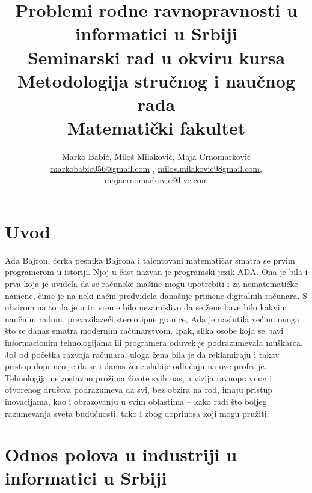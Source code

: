 \documentclass[a4paper]{article}
\begin{document}
\title{Problemi rodne ravnopravnosti u informatici u Srbiji\\
\vspace{5mm}
\small{Seminarski rad u okviru kursa\\Metodologija stručnog i naučnog rada\\ Matematički fakultet}}

\author{Marko Babić, Miloš Milaković,  Maja Crnomarković\\ \href{mailto:markobabic056@gmail.com}{markobabic056@gmail.com} , \href{mailto:milos.milakovic98@gmail.com}{milos.milakovic98gmail.com}, \href{mailto:majacrnomarkovic@live.com}{majacrnomarkovic@live.com}}

\maketitle


\tableofcontents

\newpage

\section{Uvod}
\label{sec:uvod}

Ada Bajron, ćerka pesnika Bajrona i talentovani matematičar smatra se prvim programerom u istoriji. Njoj u čast nazvan je programski jezik ADA. Ona je bila i prva koja je uvidela da se računske mašine mogu upotrebiti i za nematematičke namene,
čime je na neki način predvidela današnje primene digitalnih računara. S obzirom na to da je u to vreme bilo nezamislivo da se žene bave bilo kakvim naučnim radom, prevazilazeći stereotipne granice, Ada je naslutila većinu onoga što se danas smatra modernim računarstvom.
Ipak, slika osobe koja se bavi informacionim tehnologijama ili programera oduvek je podrazumevala muškarca. Još od početka razvoja računara, uloga žena bila je da reklamiraju    i takav pristup doprineo je da se i danas žene slabije odlučuju na ove profesije. Tehnologija neizostavno prožima živote svih nas, a vizija ravnopravnog i otvorenog društva podrazumeva da svi, bez obzira na rod, imaju pristup inovacijama, kao i obrazovanju u svim oblastima – kako radi što boljeg razumevanja sveta budućnosti, tako i zbog doprinosa koji mogu pružiti.

\section{Odnos polova u industriji u informatici u Srbiji}
\end{document}
